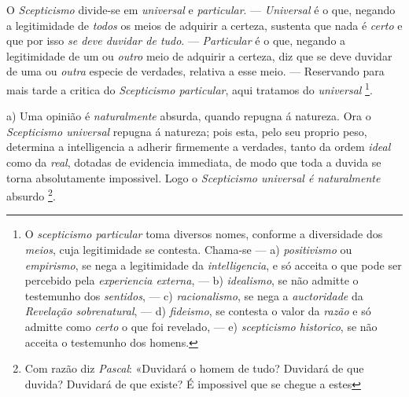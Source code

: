 
 
O \emph{Scepticismo} divide-se em \emph{universal} e \emph{particular}. --- \emph{Universal} é o que, negando a legitimidade de \emph{todos} os meios de adquirir a certeza, sustenta que nada é \emph{certo} e que por isso \emph{se deve duvidar de tudo}. --- \emph{Particular} é o que, negando a legitimidade de um ou \emph{outro} meio de adquirir a certeza, diz que se deve duvidar de uma ou \emph{outra} especie de verdades, relativa a esse meio. --- Reservando para mais tarde a critica do \emph{Scepticismo particular}, aqui tratamos do \emph{universal} \footnote{O \emph{scepticismo particular} toma diversos nomes, conforme a diversidade dos \emph{meios}, cuja legitimidade se contesta. Chama-se --- a) \emph{positivismo} ou \emph{empirismo}, se nega a legitimidade da \emph{intelligencia}, e só acceita o que pode ser percebido pela \emph{experiencia externa}, --- b) \emph{idealismo}, se não admitte o testemunho dos \emph{sentidos}, --- c) \emph{racionalismo}, se nega a \emph{auctoridade} da \emph{Revelação sobrenatural}, --- d) \emph{fideismo}, se contesta o valor da \emph{razão} e só admitte como \emph{certo} o que foi revelado, --- e) \emph{scepticismo historico}, se não acceita o testemunho dos homens.}.



a) Uma opinião é \emph{naturalmente} absurda, quando repugna á natureza. Ora o \emph{Scepticismo universal} repugna á natureza; pois esta, pelo seu proprio peso, determina a intelligencia a adherir firmemente a verdades, tanto da ordem \emph{ideal} como da \emph{real}, dotadas de evidencia immediata, de modo que toda a duvida se torna absolutamente impossivel. Logo o \emph{Scepticismo universal é naturalmente} absurdo \footnote{Com razão diz \emph{Pascal}: «Duvidará o homem de tudo? Duvidará de que duvida? Duvidará de que existe? É impossivel que se chegue a estes}.

